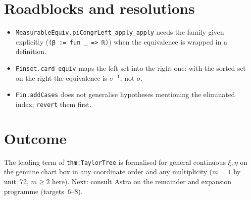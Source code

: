 \documentclass[11pt]{article}
\begin{document}
\section{Roadblocks and resolutions}
\begin{itemize}
\item \texttt{MeasurableEquiv.piCongrLeft\_apply\_apply} needs the family given explicitly
(\texttt{(β := fun \_ => ℝ)}) when the equivalence is wrapped in a definition.
\item \texttt{Finset.card\_equiv} maps the left set into the right one: with the sorted set on the
right the equivalence is $\sigma^{-1}$, not $\sigma$.
\item \texttt{Fin.addCases} does not generalise hypotheses mentioning the eliminated index;
\texttt{revert} them first.
\end{itemize}

\section{Outcome}
The leading term of \texttt{thm:TaylorTree} is formalised for general continuous $\xi,\eta$ on the
genuine chart box in any coordinate order and any multiplicity ($m=1$ by unit~72, $m\ge2$ here).
Next: consult Astra on the remainder and expansion programme (targets~6--8).
\end{document}
